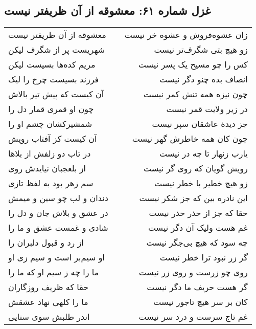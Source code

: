 \begin{center}
\section*{غزل شماره ۶۱: معشوقه از آن ظریفتر نیست}
\label{sec:061}
\begin{longtable}{l p{0.5cm} r}
معشوقه از آن ظریفتر نیست
&&
زان عشوه‌فروش و عشوه خر نیست
\\
شهریست پر از شگرف لیکن
&&
زو هیچ بتی شگرف‌تر نیست
\\
مریم کده‌ها بسیست لیکن
&&
کس را چو مسیح یک پسر نیست
\\
فرزند بسیست چرخ را لیک
&&
انصاف بده چنو دگر نیست
\\
آن کیست که پیش تیر بالاش
&&
چون نیزه همه تنش کمر نیست
\\
چون او قمری قمار دل را
&&
در زیر ولایت قمر نیست
\\
شمشیرکشان چشم او را
&&
جز دیدهٔ عاشقان سپر نیست
\\
آن کیست کز آفتاب رویش
&&
چون کان همه خاطرش گهر نیست
\\
در تاب دو زلفش از بلاها
&&
یارب زنهار تا چه در نیست
\\
از بلعجبان نیایدش روی
&&
رویش گویان که روی گر نیست
\\
سم زهر بود به لفظ تازی
&&
زو هیچ خطیر با خطر نیست
\\
دندان و لب چو سین و میمش
&&
این نادره بین که جز شکر نیست
\\
در عشق و بلاش جان و دل را
&&
حقا که جز از حذر حذر نیست
\\
شادی و غمست عشق و ما را
&&
غم هست ولیک آن دگر نیست
\\
از رد و قبول دلبران را
&&
چه سود که هیچ بی‌جگر نیست
\\
او سیم‌بر است و سیم زی او
&&
گر زر نبود ترا خطر نیست
\\
ما را چه ز سیم او که ما را
&&
روی چو زرست و روی زر نیست
\\
حقا که ظریف روزگاران
&&
گر هست حریف ما دگر نیست
\\
ما را کلهی نهاد عشقش
&&
کان بر سر هیچ تاجور نیست
\\
اندر طلبش سوی سنایی
&&
غم تاج سرست و درد سر نیست
\\
\end{longtable}
\end{center}
